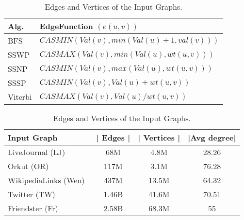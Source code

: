 \begin{table}[!t]
\caption{Benchmarks and their Edge Functions.}
\label{benchmarks}
\vspace{-0.1in}
\small
\centering
\begin{tabular}{|l|l|} \hline

Alg.
& EdgeFunction $( e(u,v) )$ \\ \hline \hline

BFS
& $CASMIN( Val(v), min( Val(u)+1, val(v) ) )$ \\ \hline

SSWP
& $CASMAX( Val(v),  min( Val(u), wt(u,v) ) )$ \\ \hline

SSNP
& $CASMIN( Val(v),  max( Val(u), wt(u,v) ) )$ \\ \hline

SSSP
& $CASMIN( Val(v),  Val(u) + wt(u,v) )$ \\ \hline

Viterbi
& $CASMAX( Val(v),  Val(u) / wt(u,v) )$ \\ \hline

\end{tabular}
\vspace{0.05in}

\captionsetup{justification=centering}
\caption{Edges and Vertices of the Input Graphs.}
\label{graphs}
\vspace{-0.1in}
\small
\centering
{\renewcommand{\arraystretch}{1.1}
\begin{tabular}{|l|c|c|c|} \hline
Input Graph & | Edges | &\!\!| Vertices |\!\! & \!\!|Avg degree|\!\!\\ \hline \hline
LiveJournal (LJ)~\cite{LJ} & 68M & 4.8M & 28.26\\ \hline
Orkut (OR)~\cite{OR} & 117M & 3.1M & 76.28\\ \hline
WikipediaLinks (Wen)~\cite{Wen}\!\!& 437M & 13.5M & 64.32\\ \hline
Twitter (TW)~\cite{TW} & 1.46B & 41.6M & 70.51\\ \hline
Friendster (Fr)~\cite{friendster} & 2.58B & 68.3M & 55\\ \hline

\end{tabular}
}
\vspace{-0.15in}
\end{table}